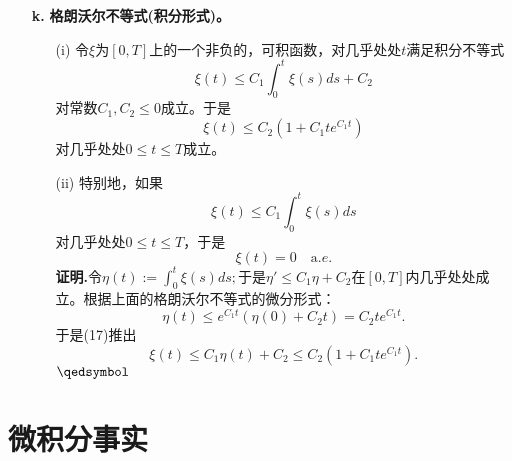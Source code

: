 \documentclass[leqno]{article}%
\begin{document}
\begin{enumerate}[fullwidth,itemindent=0em]
\item[\textbf{k.}]\textbf{格朗沃尔不等式(积分形式)。}
\begin{enumerate}[fullwidth,itemindent=2em]
	\item[(i)]令$\xi$为$[0,T]$上的一个非负的，可积函数，对几乎处处$t$满足积分不等式
	\begin{equation}
	\xi(t)\leq C_{1}\int_{0}^{t}\xi(s)ds+C_{2}
	\end{equation}
	对常数$C_{1},C_{2}\leq0$成立。于是
	\begin{equation}
	\xi(t)\leq C_{2}(1+C_{1}te^{C_{1}t})
	\end{equation}
	对几乎处处$0\leq t\leq T$成立。
	\item[(ii)]特别地，如果
	\begin{equation*}
	\xi(t)\leq C_{1}\int_{0}^{t}\xi(s)ds
	\end{equation*}
	对几乎处处$0\leq t\leq T$，于是
	\begin{equation*}
	\xi(t)=0\quad\text{a}.e.
	\end{equation*}
	\textbf{证明.}令$\eta(t):=\int_{0}^{t}\xi(s)ds;$于是$\eta'\leq C_{1}\eta+C_{2}$在$[0,T]$内几乎处处成立。根据上面的格朗沃尔不等式的微分形式：
	\begin{equation*}
	\eta(t)\leq e^{C_{1}t}\left(\eta(0)+C_{2}t\right)=C_{2}te^{C_{1}t}.
	\end{equation*}
	于是(17)推出
	\begin{equation*}
	\xi(t)\leq C_{1}\eta(t)+C_{2}\leq C_{2}(1+C_{1}te^{C_{1}t}).
	\end{equation*}
	 $\hfill\qedsymbol$


\end{enumerate}




\end{enumerate}




\section{微积分事实}
\end{document}
